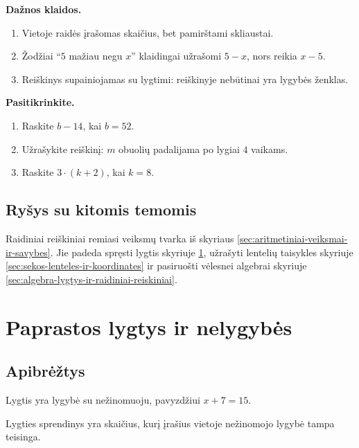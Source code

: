 \textbf{Dažnos klaidos.}
\begin{enumerate}[label=\arabic*.]
\item Vietoje raidės įrašomas skaičius, bet pamirštami skliaustai.
\item Žodžiai ``\(5\) mažiau negu \(x\)'' klaidingai užrašomi \(5-x\), nors reikia \(x-5\).
\item Reiškinys supainiojamas su lygtimi: reiškinyje nebūtinai yra lygybės ženklas.
\end{enumerate}

\textbf{Pasitikrinkite.}
\begin{enumerate}[label=\arabic*.]
\item Raskite \(b-14\), kai \(b=52\).
\item Užrašykite reiškinį: \(m\) obuolių padalijama po lygiai \(4\) vaikams.
\item Raskite \(3\cdot(k+2)\), kai \(k=8\).
\end{enumerate}

\subsection{Ryšys su kitomis temomis}

Raidiniai reiškiniai remiasi veiksmų tvarka iš skyriaus \ref{sec:aritmetiniai-veiksmai-ir-savybes}. Jie padeda spręsti lygtis skyriuje \ref{sec:paprastos-lygtys-ir-nelygybes}, užrašyti lentelių taisykles skyriuje \ref{sec:sekos-lenteles-ir-koordinates} ir pasiruošti vėlesnei algebrai skyriuje \ref{sec:algebra-lygtys-ir-raidiniai-reiskiniai}.

\section{Paprastos lygtys ir nelygybės}\label{sec:paprastos-lygtys-ir-nelygybes}

\subsection{Apibrėžtys}

\begin{apibreztis}
Lygtis yra lygybė su nežinomuoju, pavyzdžiui \(x+7=15\).
\end{apibreztis}

\begin{apibreztis}
Lygties sprendinys yra skaičius, kurį įrašius vietoje nežinomojo lygybė tampa teisinga.
\end{apibreztis}

